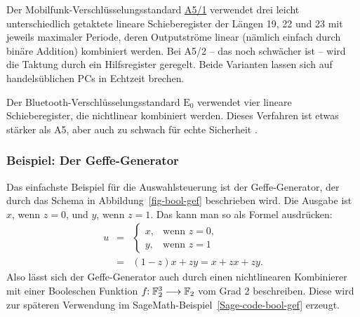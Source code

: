 \begin{refsegment}
Der Mobilfunk-Verschlüsselungsstandard
\href{http://de.wikipedia.org/wiki/A5\_(Algorithmus)}{A5/1}  %
verwendet drei leicht unterschiedlich getaktete lineare Schieberegister
der Längen 19, 22 und 23 mit jeweils maximaler Periode, deren
Outputströme linear (nämlich einfach durch binäre Addition)
kombiniert werden. Bei A5/2 -- das noch schwächer ist -- wird
die Taktung durch ein Hilfsregister geregelt. Beide Varianten
lassen sich auf handelsüblichen PCs in Echtzeit brechen.

Der Bluetooth-Verschlüsselungsstandard $\mathrm{E}_0$ verwendet vier
lineare Schieberegister, die nichtlinear kombiniert werden. Dieses Verfahren
ist etwas stärker als A5, aber auch zu schwach für echte Sicherheit \cite{Schm2016}.

\subsubsection*{Beispiel: Der Geffe-Generator}

Das einfachste Beispiel für die Auswahlsteuerung ist der
Geffe-Generator,
der durch das Schema in Abbildung~\ref{fig-bool-gef}
beschrieben wird. Die Ausgabe ist $x$, wenn $z = 0$, und $y$, wenn
$z = 1$. Das kann man so als Formel ausdrücken:
\begin{eqnarray*}
   u & = & \begin{cases}
              x, & \text{wenn } z = 0, \\
              y, & \text{wenn } z = 1
           \end{cases} \\
      & = & (1 - z) x + zy = x + zx + zy.
\end{eqnarray*}
Also lässt sich der Geffe-Generator auch durch einen nichtlinearen
Kombinierer mit einer Booleschen Funktion
$f\!\!: \mathbb{F}_2^3 \longrightarrow \mathbb{F}_2$ vom Grad 2 beschreiben. Diese
wird zur späteren Verwendung im SageMath-Beispiel~\ref{Sage-code-bool-gef}
erzeugt.


\end{refsegment}
